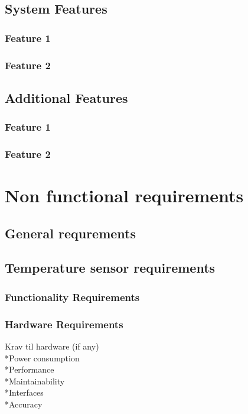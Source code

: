 \subsection{System Features}

\subsubsection{Feature 1}

\subsubsection{Feature 2}

\subsection{Additional Features}

\subsubsection{Feature 1}

\subsubsection{Feature 2}

\section{Non functional requirements}

\subsection{General requrements}

\subsection{Temperature sensor requirements}

\subsubsection{Functionality Requirements}

\subsubsection{Hardware Requirements}
Krav til hardware (if any)\\
*Power consumption\\
*Performance\\
*Maintainability\\
*Interfaces\\
*Accuracy\\
